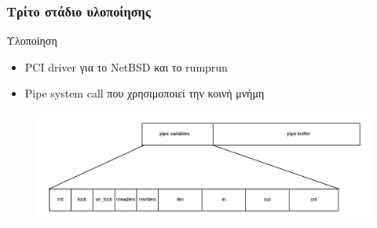 \documentclass[red,slidestop,notes,compress,mathserif]{beamer}
\begin{document}
\begin{frame}
\frametitle{Τρίτο στάδιο υλοποίησης}
\begin{block}{Υλοποίηση}
\begin{itemize}
\item PCI driver για το NetBSD και το rumprun
\item Pipe system call που χρησιμοποιεί την κοινή μνήμη
\end{itemize}
\end{block}
\begin{figure}
\center
\includegraphics[scale=0.66]{figures/shared_memoery_layout.png}
\end{figure}
\end{frame}
\end{document}
